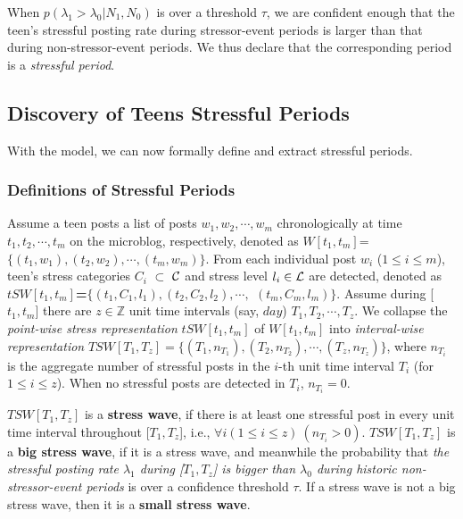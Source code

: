 When $p(\lambda_1 > \lambda_0|N_1,N_0)$ is over a threshold $\tau$,
we are confident enough that the teen's stressful posting rate during stressor-event periods
is larger than that during non-stressor-event periods. We thus declare that the
corresponding period is a \emph{stressful period}.

\subsection{Discovery of Teens Stressful Periods}

With the model, we can now formally define and extract stressful periods.

\subsubsection{Definitions of Stressful Periods}

Assume a teen posts a list of posts $w_1,w_2,\cdots,w_m$
chronologically at time $t_1,t_2,\cdots,t_m$ on the microblog, respectively, denoted as
$W[t_1,t_m]$=$\{(t_1,w_1),(t_2,w_2),\cdots,(t_m,w_m)\}$.
From each individual post $w_i$
($1 \leq i \leq m$), teen's stress categories
$C_i$ $\subset$ ${\cal C}$
and stress level $l_i \in {\cal L}$ are detected, denoted as
\textbf{$tSW[t_1,t_m]$=$\{(t_1,C_1,l_1), (t_2,C_2,l_2), \cdots,$ $(t_m,C_m,l_m)\}$}.
Assume during [$t_1,t_m$] there are $z \in \mathbb{Z}$ unit time intervals (say, $day$)
$T_1,T_2,\cdots,T_z$.
We collapse the \emph{point-wise stress representation} $tSW[t_1,t_m]$ of
$W[t_1,t_m]$
into \emph{interval-wise representation} $TSW[T_1,T_z]=\{(T_1,n_{T_1}), (T_2,n_{T_2}), \cdots, (T_z,n_{T_z})\}$, where
$n_{T_i}$ is the aggregate number of stressful posts in the $i$-th unit time interval $T_i$ (for $1 \leq i \leq z$).
When no stressful posts are detected in $T_i$, $n_{T_i}=0$.

\begin{definition}
$TSW[T_1,T_z]$ is a \textbf{stress wave}, if
there is at least one stressful post in every unit time interval throughout [$T_1,T_z$], i.e.,
$\forall i (1 \leq i \leq z) ~(n_{T_i}>0)$.
$TSW[T_1,T_z]$ is a \textbf{big stress wave}, if it is a stress wave, and meanwhile
the probability that \emph{the stressful posting rate $\lambda_1$ during [$T_1,T_z$]
is bigger than $\lambda_0$ during historic non-stressor-event periods}
is over a confidence threshold $\tau$.
If a stress wave is not a big stress wave, then it is a
\textbf{small stress wave}.
\boxend
\end{definition}

